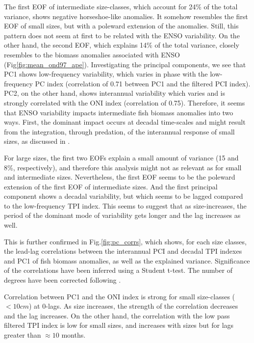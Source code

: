 The first EOF of intermediate size-classes, which account for 24\% of the total variance, shows negative horseshoe-like anomalies. It somehow resembles the first EOF of small sizes, but with a poleward extension of the anomalies. Still, this pattern does not seem at first to be related with the ENSO variability. On the other hand, the second EOF, which explains 14\% of the total variance, closely resembles to the biomass anomalies associated with ENSO (Fig\ref{fig:mean_ond97_ape}). Investigating the principal components, we see that PC1 shows low-frequency variability, which varies in phase with the low-frequency PC index (correlation of 0.71 between PC1 and the filtered PCI index). PC2, on the other hand, shows interannual variability which varies and is strongly correlated with the ONI index (correlation of 0.75). Therefore, it seems that ENSO variability impacts intermediate fish biomass anomalies into two ways. First, the dominant impact occurs at decadal time-scales and might result from the integration, through predation, of the interannual response of small sizes, as discussed in \cite{lorenzoDoubleintegrationHypothesisExplain2013}. 

For large sizes, the first two EOFs explain a small amount of variance (15 and 8\%, respectively), and therefore this analysis might not as relevant as for small and intermediate sizes. Nevertheless, the first EOF seems to be the poleward extension of the first EOF of intermediate sizes. And the first principal component shows a decadal variability, but which seems to be lagged compared to the low-frequency TPI index. This seems to suggest that as size-increases, the period of the dominant mode of variability gets longer and the lag increases as well.

This is further confirmed in Fig.\ref{fig:pc_corrs}, which shows, for each size classes, the lead-lag correlations between the interannual PCI and decadal TPI indexes and PC1 of fish biomass anomalies, as well as the explained variance. Significance of the correlations have been inferred using a Student t-test. The number of degrees have been corrected following \cite{brethertonEffectiveNumberSpatial1999}.

Correlation between PC1 and the ONI index is strong for small size-classes ($<10 cm$) at 0-lags. As size increases, the strength of the correlation decreases and the lag increases. On the other hand, the correlation with the low pass filtered TPI index is low for small sizes, and increases with sizes but for lags greater than $\approx 10$ months.

